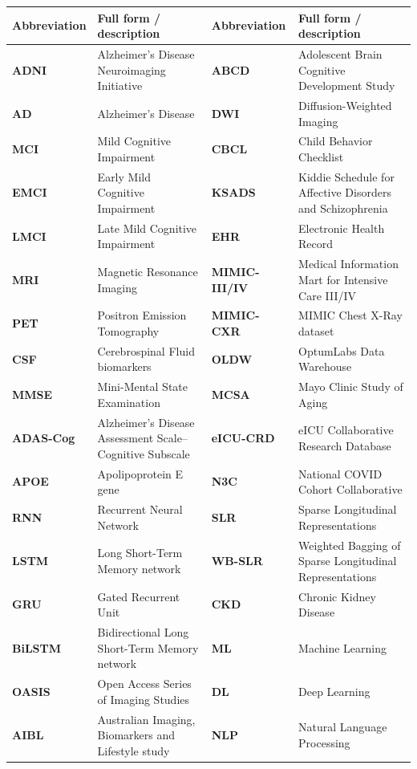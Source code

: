 \documentclass[11pt]{article}
\theoremstyle{plain}
\theoremstyle{definition}
\theoremstyle{remark}
\begin{document}
\begin{table}[!t]
\centering
\small
\setlength{\tabcolsep}{3pt}
\renewcommand{\arraystretch}{0.95}
\begin{tabularx}{\textwidth}{@{}>{\bfseries}p{1.9cm}X!{\vrule width 0.35pt}>{\bfseries}p{1.9cm}X@{}}
\toprule
{}
\textbf{Abbreviation} & \textbf{Full form / description} & \textbf{Abbreviation} & \textbf{Full form / description} \\
\midrule
ADNI & Alzheimer's Disease Neuroimaging Initiative & ABCD & Adolescent Brain Cognitive Development Study \\
AD & Alzheimer's Disease & DWI & Diffusion-Weighted Imaging \\
MCI & Mild Cognitive Impairment & CBCL & Child Behavior Checklist \\
EMCI & Early Mild Cognitive Impairment & KSADS & Kiddie Schedule for Affective Disorders and Schizophrenia \\
LMCI & Late Mild Cognitive Impairment & EHR & Electronic Health Record \\
MRI & Magnetic Resonance Imaging & MIMIC-III/IV & Medical Information Mart for Intensive Care III/IV \\
PET & Positron Emission Tomography & MIMIC-CXR & MIMIC Chest X-Ray dataset \\
CSF & Cerebrospinal Fluid biomarkers & OLDW & OptumLabs Data Warehouse \\
MMSE & Mini-Mental State Examination & MCSA & Mayo Clinic Study of Aging \\
ADAS-Cog & Alzheimer's Disease Assessment Scale--Cognitive Subscale & eICU-CRD & eICU Collaborative Research Database \\
APOE & Apolipoprotein E gene & N3C & National COVID Cohort Collaborative \\
RNN & Recurrent Neural Network & SLR & Sparse Longitudinal Representations \\
LSTM & Long Short-Term Memory network & WB-SLR & Weighted Bagging of Sparse Longitudinal Representations \\
GRU & Gated Recurrent Unit & CKD & Chronic Kidney Disease \\
BiLSTM & Bidirectional Long Short-Term Memory network & ML & Machine Learning \\
OASIS & Open Access Series of Imaging Studies & DL & Deep Learning \\
AIBL & Australian Imaging, Biomarkers and Lifestyle study & NLP & Natural Language Processing \\

\end{tabularx}
\end{table}
\end{document}
